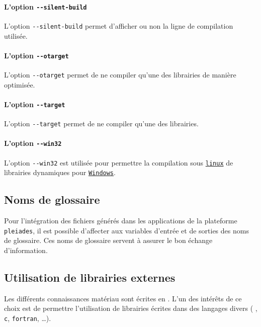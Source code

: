 \documentclass[rectoverso,pleiades,pstricks,leqno,anti]{texmf/note_technique_2010}
\newcommand{\pleiades}{\texttt{pleiades}}
\newcommand{\moption}[1]{\texttt{-{}-#1}}
\def\ifmonospace{\ifdim\fontdimen3\font=0pt }
\def\cpp{%
\ifmonospace%
    C++%
\else%
    C\kern-.1667em\raise.30ex\hbox{\smaller{++}}%
\fi%
\spacefactor1000 }
\newcommand{\windows}{\href{http://www.microsoft.com/france/windows/default.mspx}{\texttt{Windows}}}
\newcommand{\linux}{\href{http://www.kernel.org/}{\texttt{linux}}}
\begin{document}
\paragraph{L'option \moption{silent-build}}
L'option \moption{silent-build} permet d'afficher ou non la ligne de
compilation utilisée.

\paragraph{L'option \moption{otarget}} L'option
\moption{otarget} permet de ne compiler qu'une des librairies de manière
optimisée.

\paragraph{L'option \moption{target}} L'option
\moption{target} permet de ne compiler qu'une des librairies.

\paragraph{L'option \moption{win32}} L'option
\moption{win32} est utilisée pour permettre la compilation sous \linux{}
de librairies dynamiques pour \windows{}.


\subsection{Noms de glossaire}

Pour l'intégration des fichiers générés dans les applications de la
plateforme \pleiades{}, il est possible d'affecter aux variables
d'entrée et de sorties des noms de glossaire. Ces noms de glossaire
servent à assurer le bon échange d'information.

\subsection{Utilisation de librairies externes}

Les différents connaissances matériau sont écrites en \cpp{}. L'un des
intérêts de ce choix est de permettre l'utilisation de librairies
écrites dans des langages divers (\cpp{}, \texttt{c}, \texttt{fortran},
\ldots).
\end{document}
